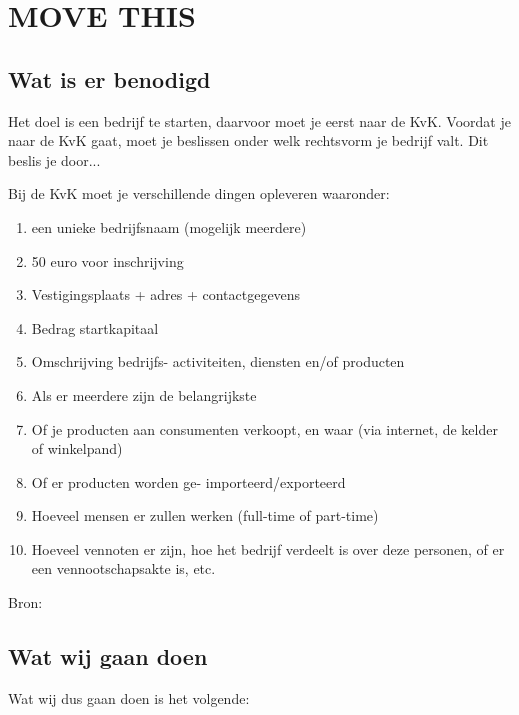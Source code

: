 \documentclass[11pt,oneside,a4paper,numbers=enddot]{report} %
\begin{document}
\Pre








\chapter{MOVE THIS}
\section{Wat is er benodigd}

Het doel is een bedrijf te starten, daarvoor moet je eerst naar de KvK.
Voordat je naar de KvK gaat, moet je beslissen onder welk rechtsvorm je bedrijf valt.
Dit beslis je door... 

Bij de KvK moet je verschillende dingen opleveren waaronder:

\begin{enumerate}

\item
  een unieke bedrijfsnaam (mogelijk meerdere)
\item
  50 euro voor inschrijving
\item
  Vestigingsplaats
  + adres
  + contactgegevens
\item
  Bedrag startkapitaal
\item
  Omschrijving bedrijfs- activiteiten,
  diensten en/of
  producten
\item
  Als er meerdere zijn de belangrijkste
\item
  Of je producten aan consumenten verkoopt,
  en waar
  (via internet,
  de kelder of winkelpand)
\item
  Of er producten worden ge- importeerd/exporteerd
\item
  Hoeveel mensen er zullen werken
  (full-time of part-time)
\item
  Hoeveel vennoten er zijn,
  hoe het bedrijf verdeelt is over deze personen,
  of er een vennootschapsakte is,
  etc.
  
\end{enumerate}

Bron: \cite{kvk}

\section{Wat wij gaan doen}

Wat wij dus gaan doen is het volgende:
\end{document}
